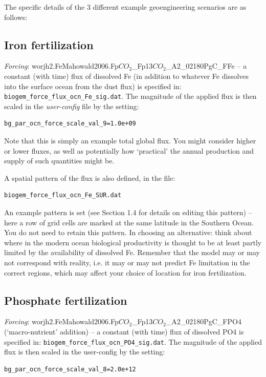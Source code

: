 \documentclass[11pt,fleqn]{book} %
\begin{document}
The specific details of the 3 different example geoengineering scenarios are as follows:


\subsection{Iron fertilization}

\textit{Forcing}: \textsf{\footnotesize worjh2.FeMahowald2006.Fp\(CO_{2}\)\_Fp13\(CO_{2}\)\_A2\_02180PgC\_FFe} -- a constant (with time) flux of dissolved Fe (in addition to whatever Fe dissolves into the surface ocean from the dust flux) is specified in: \texttt{biogem\_force\_flux\_ocn\_Fe\_sig.dat}. The magnitude of the applied flux is then scaled in the \textit{user-config} file by the setting:
\small\begin{verbatim}
bg_par_ocn_force_scale_val_9=1.0e+09
\end{verbatim}\normalsize
Note that this is simply an example total global flux. You might consider higher or lower fluxes, as well as potentially how ‘practical’ the annual production and supply of such quantities might be.

A spatial pattern of the flux is also defined, in the file:
\small\begin{verbatim}
biogem_force_flux_ocn_Fe_SUR.dat
\end{verbatim}\normalsize

An example pattern is set (see Section 1.4 for details on editing this pattern) – here a row of grid cells are marked at the same latitude in the Southern Ocean. You do not need to retain this pattern. In choosing an alternative: think about where in the modern ocean biological productivity is thought to be at least partly limited by the availability of dissolved Fe. Remember that the model may or may not correspond with reality, i.e. it may or may not predict Fe limitation in the correct regions, which may affect your choice of location for iron fertilization.


\subsection{Phosphate fertilization}

\textit{Forcing}: \textsf{\footnotesize worjh2.FeMahowald2006.Fp\(CO_{2}\)\_Fp13\(CO_{2}\)\_A2\_02180PgC\_FPO4} (‘macro-nutrient’ addition) -- a constant (with time) flux of dissolved PO4 is specified in: \texttt{biogem\_force\_flux\_ocn\_PO4\_sig.dat}. The magnitude of the applied flux is then scaled in the user-config by the setting:
\small\begin{verbatim}
bg_par_ocn_force_scale_val_8=2.0e+12 
\end{verbatim}\normalsize
\end{document}
